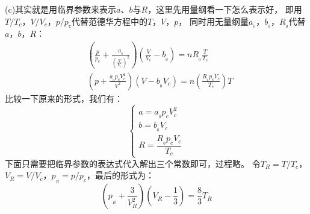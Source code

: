 \begin{solution}
        (c)其实就是用临界参数来表示$a$、$b$与$R$，这里先用量纲看一下怎么表示好，
        即用$T/T_c$，$V/V_c$，$p/p_c$代替范德华方程中的$T$，$V$，$p$，
        同时用无量纲量$a_{_0}$，$b_{_0}$，$R_{_0}$代替$a$，$b$，$R$：
        \begin{equation*}
            \begin{aligned}
                &(\frac{p}{p_c}+\frac{a_{_0}}{\left(\frac{V}{V_c}\right)^{2}})(\frac{V}{V_c}-b_{_0})=nR_{_0}\frac{T}{T_c}\\
                &(p+\frac{a_{_0}p_{c}V_{c}^2}{V^2})(V-b_{_0}V_c) = n(\frac{R_{_0}p_{c}V_{c}}{T_{c}})T
            \end{aligned}
        \end{equation*}        
        比较一下原来的形式，我们有：
        \begin{equation*}
            \begin{cases}
                a = a_{_0}p_{c}V_{c}^2\\
                b = b_{_0}V_c\\
                R = \dfrac{R_{_0}p_{c}V_{c}}{T_{c}}
            \end{cases}
        \end{equation*}
        下面只需要把临界参数的表达式代入解出三个常数即可，过程略。
        令$T_R = T/T_c$，$V_R = V/V_c$，$p_{_R} = p/p_c$，最后的形式为：
        \begin{equation*}
            (p_{_R}+\frac{3}{V_R^{2}})(V_R-\frac{1}{3})=\frac{8}{3}T_R
        \end{equation*}
    \end{solution}

